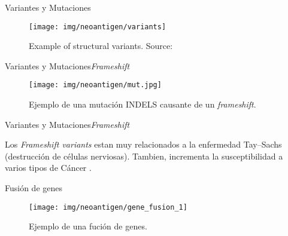 \documentclass[10pt]{beamer}
\newcommand{\1}{
	\setbeamertemplate{background}{
		\texttt{[image: img/1]}
		\tikz[overlay] \fill[fill opacity=0.75,fill=white] (0,0) rectangle (-\paperwidth,\paperheight);
	}
}
\begin{document}
\begin{frame}{Variantes y Mutaciones}{}
	\begin{figure}[h]
		\centering
		\texttt{[image: img/neoantigen/variants]}
		\caption{Example of structural variants. Source: \cite{sv_pacbio_2021}}
		\label{fig:variants}
	\end{figure}	
\end{frame}

\begin{frame}{Variantes y Mutaciones}{\textit{Frameshift}}
	\begin{figure}[]
		\centering
		\texttt{[image: img/neoantigen/mut.jpg]}
		\caption{Ejemplo de una mutación INDELS causante de un \textit{frameshift}.}
	\end{figure}
\end{frame}

\begin{frame}{Variantes y Mutaciones}{\textit{Frameshift}}
	\begin{block}{}
		Los \textit{Frameshift variants} estan muy relacionados a la enfermedad Tay–Sachs  (destrucción de células nerviosas). Tambien, incrementa la susceptibilidad a varios tipos de Cáncer \cite{zimmerman1997inherited, xu2018review}.
	\end{block}	
\end{frame}

\begin{frame}{Fusión de genes}{}
	\begin{figure}[h]
		\centering
		\texttt{[image: img/neoantigen/gene\_fusion\_1]}
		\caption{Ejemplo de una fución de genes.}
		\label{fig:cnv}
	\end{figure}	
\end{frame}
\end{document}
